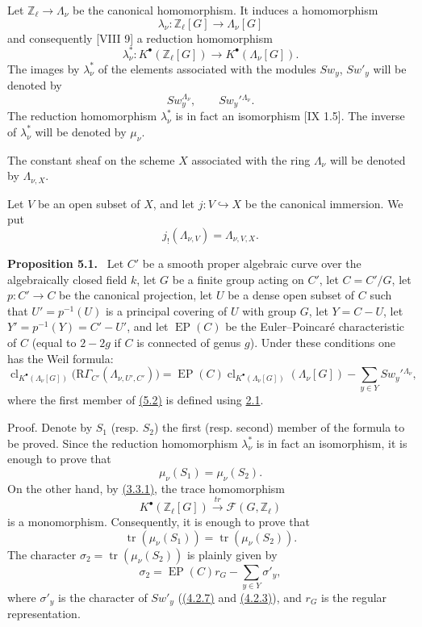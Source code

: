 \documentclass[11pt]{article}
\newenvironment{statement}[1]{\par\medskip\noindent\textbf{#1.}\ }{\par\medskip}
\providecommand{\EP}{\operatorname{EP}}
\providecommand{\EP}{\operatorname{EP}}
\providecommand{\clKstar}[1]{\operatorname{cl}_{K^{\bullet}(#1)}}
\providecommand{\RG}{\mathrm R\Gamma}
\begin{document}
Let $\mathbb Z_\ell\to\Lambda_\nu$ be the canonical homomorphism. It induces a homomorphism
\[
\lambda_\nu:\mathbb Z_\ell[G]\longrightarrow \Lambda_\nu[G]
\]
and consequently [VIII 9] a reduction homomorphism
\[
\lambda_\nu^*:K^{\bullet}(\mathbb Z_\ell[G])\longrightarrow K^{\bullet}(\Lambda_\nu[G]).
\]
The images by $\lambda_\nu^*$ of the elements associated with the modules $Sw_y$, $Sw'_y$ will be denoted by
\[
Sw_y^{\Lambda_\nu},\qquad Sw_y'{}^{\Lambda_\nu}.
\]
The reduction homomorphism $\lambda_\nu^*$ is in fact an isomorphism [IX 1.5]. The inverse of $\lambda_\nu^*$ will be denoted by $\mu_\nu$.

The constant sheaf on the scheme $X$ associated with the ring $\Lambda_\nu$ will be denoted by $\Lambda_{\nu,X}$.

Let $V$ be an open subset of $X$, and let $j:V\hookrightarrow X$ be the canonical immersion. We put
\[
j_!(\Lambda_{\nu,V})=\Lambda_{\nu,V,X}.
\]

\label{sga5:X:proposition:5.1}\begin{statement}{Proposition 5.1}
Let $C'$ be a smooth proper algebraic curve over the algebraically closed field $k$, let $G$ be a finite group acting on $C'$, let $C=C'/G$, let $p:C'\to C$ be the canonical projection, let $U$ be a dense open subset of $C$ such that $U'=p^{-1}(U)$ is a principal covering of $U$ with group $G$, let $Y=C-U$, let $Y'=p^{-1}(Y)=C'-U'$, and let $\EP(C)$ be the Euler--Poincaré characteristic of $C$ (equal to $2-2g$ if $C$ is connected of genus $g$).
Under these conditions one has the Weil formula:
\[
\clKstar{\Lambda_\nu[G]}\bigl(\RG_{C'}(\Lambda_{\nu,U',C'})\bigr)
=
\EP(C)\clKstar{\Lambda_\nu[G]}(\Lambda_\nu[G])
-\sum_{y\in Y}Sw_y'{}^{\Lambda_\nu},
\tag{5.2}\label{sga5:X:equation:5.2}
\]
where the first member of \hyperref[sga5:X:equation:5.2]{(5.2)} is defined using \hyperref[sga5:X:lemma:2.1]{2.1}.
\end{statement}

Proof. Denote by $S_1$ (resp. $S_2$) the first (resp. second) member of the formula to be proved. Since the reduction homomorphism $\lambda_\nu^*$ is in fact an isomorphism, it is enough to prove that
\[
\mu_\nu(S_1)=\mu_\nu(S_2).
\]
On the other hand, by \hyperref[sga5:X:equation:3.3.1]{(3.3.1)}, the trace homomorphism
\[
K^{\bullet}(\mathbb Z_\ell[G])\xrightarrow{\ tr\ }\mathcal F(G,\mathbb Z_\ell)
\]
is a monomorphism. Consequently, it is enough to prove that
\[
\operatorname{tr}(\mu_\nu(S_1))=\operatorname{tr}(\mu_\nu(S_2)).
\]
The character $\sigma_2=\operatorname{tr}(\mu_\nu(S_2))$ is plainly given by
\[
\sigma_2=\EP(C)r_G-\sum_{y\in Y}\sigma'_y,
\tag{5.2.1}\label{sga5:X:equation:5.2.1}
\]
where $\sigma'_y$ is the character of $Sw'_y$ (\hyperref[sga5:X:equation:4.2.7]{(4.2.7)} and \hyperref[sga5:X:equation:4.2.3]{(4.2.3)}), and $r_G$ is the regular representation.
\end{document}
